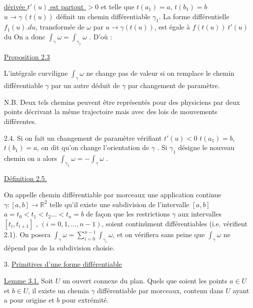 
\uline{dérivée $t'(u)$ est partout $> 0$} et telle que $t(a_1) = a$, $t(b_1) = b$
$u \to \gamma\,(t(u))$ définit un chemin différentiable $\gamma_1$. La forme différentielle
$f_1(u).du$, transformée de $\omega$ par $u \to \gamma(t(u))$, est égale à $f(t(u))\ t'(u)$ du
On a donc $\int_\gamma \omega = \int_{\gamma_1} \omega$ . D'où :

\uline{Proposition 2.3}

L'intégrale curviligne $\int_\gamma \omega$ ne change pas de valeur si on remplace
le chemin différentiable $\gamma$ par un autre déduit de $\gamma$ par changement de
paramètre.

N.B. Deux tels chemins peuvent être représentés pour des physiciens par deux
points décrivant la même trajectoire mais avec des lois de mouvements différentes.

2.4. Si on fait un changement de paramètre vérifiant $t'(u) < 0$
$t(a_1) = b$, $t(b_1) = a$, on dit qu'on change l'orientation de $\gamma$ . Si $\gamma_1$
désigne le nouveau chemin on a alors $\int_{\gamma_1} \omega = - \int_\gamma \omega$ .

\uline{Définition 2.5.}

On appelle chemin différentiable par morceaux une application
continue $\gamma : [a,b] \to \mathbb{R}^2$ telle qu'il existe une subdivision de l'intervalle
$[a,b]$ $a = t_0 < t_1 < t_2 \dots < t_n = b$ de façon que les restrictions $\gamma$ aux
intervalles $[t_i, t_{i+1}]$ , $(i = 0,1,\dots,n-1)$, soient continûment différentiables
(i.e. vérifient 2.1).
On posera $\int_\gamma \omega = \sum_{i=0}^{n-1} \int_{\gamma_i} \omega$, et on vérifiera sans peine que $\int_\gamma \omega$ ne dépend
pas de la subdivision choisie.

3. \uline{Primitives d'une forme différentiable}

\uline{Lemme 3.1.} Soit $U$ un ouvert connexe du plan. Quels que soient les points
$a \in U$ et $b \in U$, il existe un chemin $\gamma$ différentiable par morceaux, contenu
dans $U$ ayant a pour origine et $b$ pour extrémité.

